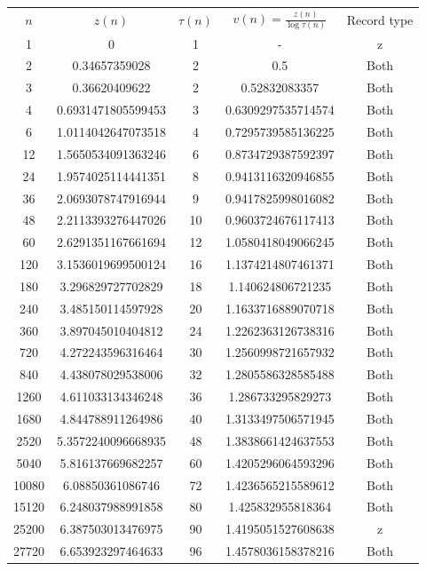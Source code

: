 \documentclass{article}
\begin{document}
     \begin{center}
\begin{tabular}{ |c|c|c|c|c| } 
 \hline
$n$ & $z(n)$ & $\tau(n)$  & $v(n)=\frac{z(n)}{\log \tau(n)}$ & Record type  \\ 
1 & 0 & 1 & - & z\\
2 & 0.34657359028 & 2 & 0.5 & Both \\
3 & 0.36620409622 & 2 &  0.52832083357 & Both \\
4 & 0.6931471805599453 & 3 & 0.6309297535714574	& Both \\
6 &	1.0114042647073518 & 4 & 0.7295739585136225	& Both \\
12 &	1.5650534091363246 & 6 & 0.8734729387592397 & Both\\
24 & 1.9574025114441351	& 8	&  0.9413116320946855 & Both \\
36 &	 2.0693078747916944	&  9 & 0.9417825998016082 & Both \\
48	&  2.2113393276447026 &	 10 & 0.9603724676117413 & Both\\
60	&   2.6291351167661694 & 12 &  1.0580418049066245 & Both \\
120	&  3.1536019699500124 & 16	& 1.1374214807461371 & Both \\
180	&  3.296829727702829 &  18	& 1.140624806721235	& Both \\
240	& 3.485150114597928	&  20 &  1.1633716889070718	& Both \\
360	& 3.897045010404812	& 24 &  1.2262363126738316	& Both \\
720	& 4.272243596316464	& 30 &  1.2560998721657932 & Both \\	
840	& 4.438078029538006	&  32 & 1.2805586328585488	 & Both \\
1260 & 4.611033134346248 &  36 & 1.286733295829273 & Both \\
1680 &	4.844788911264986 & 40 & 1.3133497506571945 & Both \\	
2520 &  5.3572240096668935 &  48 &  1.3838661424637553 & Both \\
5040 &	5.816137669682257 &  60	& 1.4205296064593296 & Both \\
10080 &	6.08850361086746 &	 72 & 1.4236565215589612 & Both \\	
15120 & 6.248037988991858 & 80 & 1.425832955818364	& Both \\
25200 &	6.387503013476975 &	 90	&1.4195051527608638	& z \\
27720 &	6.653923297464633 &	 96 &  1.4578036158378216 & Both \\

\end{tabular}
\end{center}
\end{document}
